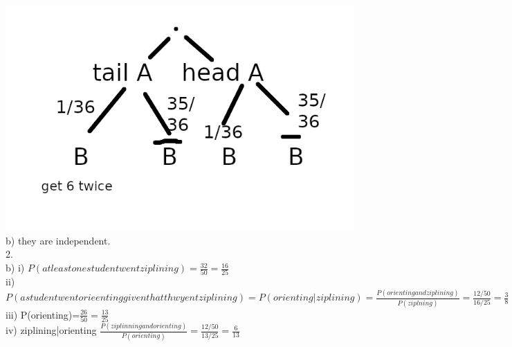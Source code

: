 \documentclass{article}
\begin{document}
  \includegraphics{23-4-11b-1-a}
  b) they are independent.\\
  2. \\
  b) i) $P(atleast one student went ziplining)=\frac{32}{50}=\frac{16}{25}$\\
  ii) $P(a student went orieenting given that thwy ent ziplining)=P(orienting | zip lining)=\frac{P(orienting and ziplining)}{P(zip lning)}=\frac{12/50}{16/25}=\frac{3}{8}$\\
  iii) P(orienting)=$\frac{26}{50}=\frac{13}{25}$\\
  iv) ziplining|orienting $\frac{P(zip linning and orienting)}{P(orienting)}=\frac{12/50}{13/25}=\frac{6}{13}$\\
  
\end{document}
